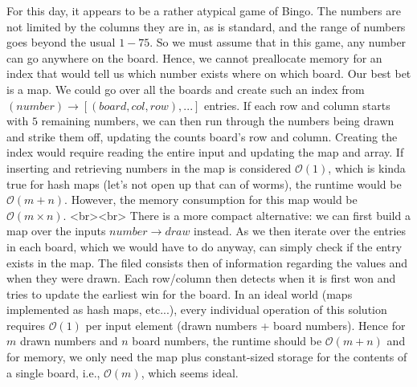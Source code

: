 For this day, it appears to be a rather atypical game of Bingo. The numbers are not limited by the columns they are in, as is standard, and the range of numbers goes beyond the usual $1-75$. So we must assume that in this game, any number can go anywhere on the board. Hence, we cannot preallocate memory for an index that would tell us which number exists where on which board. Our best bet is a map. We could go over all the boards and create such an index from $(number) \rightarrow [(board, col, row), ...]$ entries. If each row and column starts with $5$ remaining numbers, we can then run through the numbers being drawn and strike them off, updating the counts board's row and column. Creating the index would require reading the entire input and updating the map and array. If inserting and retrieving numbers in the map is considered $\mathcal{O}(1)$, which is kinda true for hash maps (let's not open up that can of worms), the runtime would be $\mathcal{O}(m + n)$. However, the memory consumption for this map would be $\mathcal{O}(m \times n)$. 
<br><br>
There is a more compact alternative: we can first build a map over the inputs $number \rightarrow draw$ instead. As we then iterate over the entries in each board, which we would have to do anyway, can simply check if the entry exists in the map. 
The filed consists then of information regarding the values and when they were drawn. Each row/column then detects when it is first won and tries to update the earliest win for the board. In an ideal world (maps implemented as hash maps, etc...), every individual operation of this solution requires $\mathcal{O}(1)$ per input element (drawn numbers + board numbers). Hence for $m$ drawn numbers and $n$ board numbers, the runtime should be $\mathcal{O}(m + n)$ and for memory, we only need the map plus constant-sized storage for the contents of a single board, i.e., $\mathcal{O}(m)$, which seems ideal. 